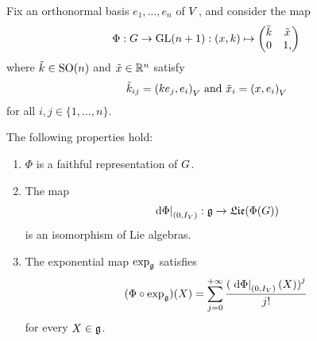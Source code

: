 \begin{proposition}
    Fix an orthonormal basis $e_1, \dots, e_n$ of $V$,
    and consider the map
    \begin{align*}
        \Phi : G \to \mathrm{GL}(n + 1) : (x, k) \mapsto
        \begin{pmatrix}
            \tilde k & \tilde x\\
            0 & 1,
        \end{pmatrix}
    \end{align*}
    where $\tilde k \in {\mathrm{SO} (n)}$ and $\tilde x \in \mathbb{R}^n$ satisfy
    \begin{align*}
        {\tilde k}_{ij} = {\left(k e_j, e_i\right)_{V}} \text{ and } {\tilde x}_i = {\left(x, e_i\right)_{V}}
    \end{align*}
    for all $i, j \in \{1, \dots, n\}$.

    The following properties hold:
    \begin{enumerate}
        \item $\Phi$ is a faithful representation of $G$.
        \item The map
            \begin{align*}
                \left. \,\mathrm{d} \Phi \right|_{(0, {I_{V}})} : \mathfrak{g} \to \mathfrak{Lie}(\Phi(G))
            \end{align*}
            is an isomorphism of Lie algebras.
        \item The exponential map $\exp_{\mathfrak{g}}$ satisfies
            \begin{align*}
                (\Phi \circ \exp_{\mathfrak{g}}) (X) = \sum_{j = 0}^{+\infty} \frac {{(\left. \,\mathrm{d} \Phi \right|_{(0, {I_{V}})}(X))}^j} {j!}
            \end{align*}
            for every $X \in \mathfrak{g}$.
    \end{enumerate}
\end{proposition}
